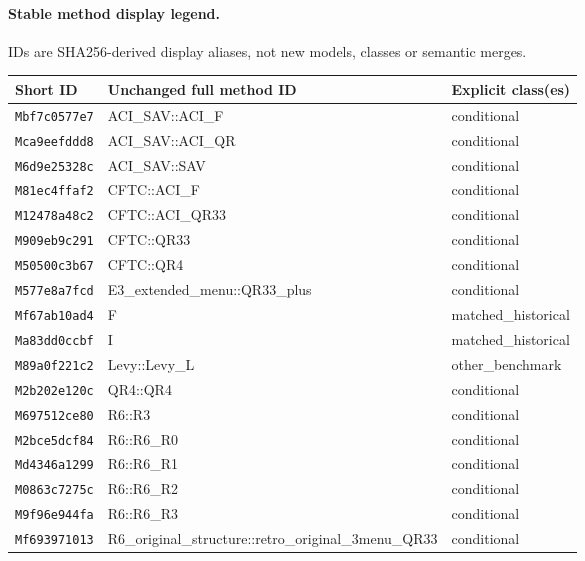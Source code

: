 \paragraph{Stable method display legend.} IDs are SHA256-derived display aliases, not new models, classes or semantic merges.
\begin{longtable}{p{.19\linewidth}p{.58\linewidth}p{.15\linewidth}}
\toprule
Short ID & Unchanged full method ID & Explicit class(es) \\
\midrule
\endhead
\texttt{Mbf7c0577e7} & ACI\_\allowbreak{}SAV::\allowbreak{}ACI\_\allowbreak{}F & conditional \\
\texttt{Mca9eefddd8} & ACI\_\allowbreak{}SAV::\allowbreak{}ACI\_\allowbreak{}QR & conditional \\
\texttt{M6d9e25328c} & ACI\_\allowbreak{}SAV::\allowbreak{}SAV & conditional \\
\texttt{M81ec4ffaf2} & CFTC::\allowbreak{}ACI\_\allowbreak{}F & conditional \\
\texttt{M12478a48c2} & CFTC::\allowbreak{}ACI\_\allowbreak{}QR33 & conditional \\
\texttt{M909eb9c291} & CFTC::\allowbreak{}QR33 & conditional \\
\texttt{M50500c3b67} & CFTC::\allowbreak{}QR4 & conditional \\
\texttt{M577e8a7fcd} & E3\_\allowbreak{}extended\_\allowbreak{}menu::\allowbreak{}QR33\_\allowbreak{}plus & conditional \\
\texttt{Mf67ab10ad4} & F & matched\_\allowbreak{}historical \\
\texttt{Ma83dd0ccbf} & I & matched\_\allowbreak{}historical \\
\texttt{M89a0f221c2} & Levy::\allowbreak{}Levy\_\allowbreak{}L & other\_\allowbreak{}benchmark \\
\texttt{M2b202e120c} & QR4::\allowbreak{}QR4 & conditional \\
\texttt{M697512ce80} & R6::\allowbreak{}R3 & conditional \\
\texttt{M2bce5dcf84} & R6::\allowbreak{}R6\_\allowbreak{}R0 & conditional \\
\texttt{Md4346a1299} & R6::\allowbreak{}R6\_\allowbreak{}R1 & conditional \\
\texttt{M0863c7275c} & R6::\allowbreak{}R6\_\allowbreak{}R2 & conditional \\
\texttt{M9f96e944fa} & R6::\allowbreak{}R6\_\allowbreak{}R3 & conditional \\
\texttt{Mf693971013} & R6\_\allowbreak{}original\_\allowbreak{}structure::\allowbreak{}retro\_\allowbreak{}original\_\allowbreak{}3menu\_\allowbreak{}QR33 & conditional \\

\end{longtable}
